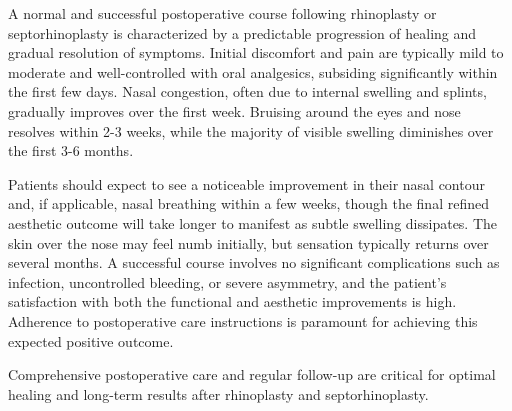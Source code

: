 A normal and successful postoperative course following rhinoplasty or septorhinoplasty is characterized by a predictable progression of healing and gradual resolution of symptoms. Initial discomfort and pain are typically mild to moderate and well-controlled with oral analgesics, subsiding significantly within the first few days. Nasal congestion, often due to internal swelling and splints, gradually improves over the first week. Bruising around the eyes and nose resolves within 2-3 weeks, while the majority of visible swelling diminishes over the first 3-6 months.

Patients should expect to see a noticeable improvement in their nasal contour and, if applicable, nasal breathing within a few weeks, though the final refined aesthetic outcome will take longer to manifest as subtle swelling dissipates. The skin over the nose may feel numb initially, but sensation typically returns over several months. A successful course involves no significant complications such as infection, uncontrolled bleeding, or severe asymmetry, and the patient's satisfaction with both the functional and aesthetic improvements is high. Adherence to postoperative care instructions is paramount for achieving this expected positive outcome.

Comprehensive postoperative care and regular follow-up are critical for optimal healing and long-term results after rhinoplasty and septorhinoplasty.

